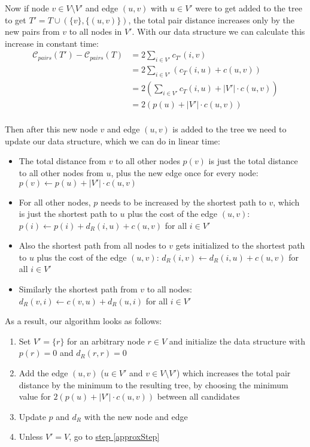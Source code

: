 \documentclass[a4paper, oneside]{discothesis}
\begin{document}
Now if node $v\in V\setminus V'$ and edge $(u,v)$ with $u\in V'$ were to get added to the tree to get $T'=T\cup(\{v\}, \{(u,v)\})$, the total pair distance increases only by the new pairs from $v$ to all nodes in $V'$. With our data structure we can calculate this increase in constant time:
\begin{equation}
\begin{split}
\mathcal{C}_{pairs}(T')-\mathcal{C}_{pairs}(T)&=2\sum_{i\in V'}c_{T'}(i, v)\\
&=2\sum_{i\in V'}\left(c_T(i,u)+c(u,v)\right) \\
&=2\left(\sum_{i\in V'}c_T(i,u)+|V'|\cdot c(u,v)\right)\\
&=2\left(p(u)+|V'|\cdot c(u,v)\right) \\
\end{split}
\end{equation}

Then after this new node $v$ and edge $(u,v)$ is added to the tree we need to update our data structure, which we can do in linear time:
\begin{itemize}
\item The total distance from $v$ to all other nodes $p(v)$ is just the total distance to all other nodes from $u$, plus the new edge once for every node: $p(v)\gets p(u)+|V'|\cdot c(u,v)$
\item For all other nodes, $p$ needs to be increased by the shortest path to $v$, which is just the shortest path to $u$ plus the cost of the edge $(u,v)$: $p(i)\gets p(i)+d_R(i,u)+c(u,v)$ for all $i\in V'$
\item Also the shortest path from all nodes to $v$ gets initialized to the shortest path to $u$ plus the cost of the edge $(u,v)$: $d_R(i,v)\gets d_R(i,u)+c(u,v)$ for all $i\in V'$
\item Similarly the shortest path from $v$ to all nodes: $d_R(v,i)\gets c(v,u)+d_R(u,i)$ for all $i\in V'$
\end{itemize}

As a result, our algorithm looks as follows:
\begin{enumerate}
\item Set $V'=\{r\}$ for an arbitrary node $r\in V$ and initialize the data structure with $p(r)=0$ and $d_R(r,r)=0$
\item Add the edge $(u,v)$ ($u\in V'$ and $v\in V\setminus V'$) which increases the total pair distance by the minimum to the resulting tree, by choosing the minimum value for $2\left(p(u)+|V'|\cdot c(u,v)\right)$ between all candidates
\label{approxStep}
\item Update $p$ and $d_R$ with the new node and edge
\item Unless $V'=V$, go to \hyperref[approxStep]{step \ref{approxStep}}
\end{enumerate}
\end{document}
